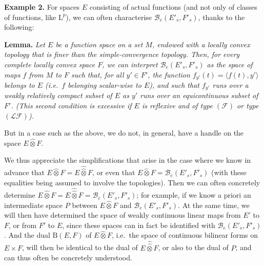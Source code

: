 \documentclass[british]{article}
\newenvironment{itenv}[1]
  {\phantomsection\par\smallskip\noindent\textbf{#1.}\itshape}
  {\par\smallskip}
\newenvironment{rmenv}[1]
  {\phantomsection\par\smallskip\noindent\textbf{#1.}\rmfamily}
  {\par\smallskip}
\newcommand{\oldpage}[1]{\marginpar{\footnotesize$\Big\vert$ \textit{p.~#1}}}
\begin{document}
\protect{}\label{section-2-example-2}
\begin{rmenv}{Example 2}
For spaces \(E\) consisting of actual functions (and not only of classes
of functions, like \(\mathrm{L}^p\)), we can often characterise
\(\mathscr{B}_e(E'_s,F'_s)\), thanks to the following:

\end{rmenv}

\oldpage{99}

\protect{}\label{section-1-lemma}
\begin{itenv}{Lemma}
Let \(E\) be a function space on a set \(M\), endowed with a locally
convex topology that is finer than the simple-convergence topology.
Then, for every complete locally convex space \(F\), we can interpret
\(\mathscr{B}_e(E'_s,F'_s)\) as the space of maps \(f\) from \(M\) to
\(F\) such that, for all \(y'\in F'\), the function
\(f_{y'}(t)=\langle f(t),y'\rangle\) belongs to \(E\) (i.e.~\(f\)
belonging \emph{scalar-wise} to \(E\)), and such that \(f_{y'}\) runs
over a weakly relatively compact subset of \(E\) as \(y'\) runs over an
equicontinuous subset of \(F'\). (This second condition is excessive if
\(E\) is reflexive and of type \((\mathscr{F})\) or type
\((\mathscr{LF})\)).

\end{itenv}

But in a case such as the above, we do not, in general, have a handle on
the space \(E\hat{\otimes}F\).

We thus appreciate the simplifications that arise in the case where we
know in advance that \(E\hat{\otimes}F=E\hat{\hat{\otimes}}F\), or even
that \(E\hat{\otimes}F=\mathscr{B}_e(E'_s,F'_s)\) (with these equalities
being assumed to involve the topologies). Then we can often concretely
determine
\(E\hat{\otimes}F=E\hat{\hat{\otimes}}F=\mathscr{B}_e(E'_s,F'_s)\); for
example, if we know a priori an intermediate space \(P\) between
\(E\hat{\otimes}F\) and \(\mathscr{B}_e(E'_s,F'_s)\). At the same time,
we will then have determined the space of weakly continuous linear maps
from \(E'\) to \(F\), or from \(F'\) to \(E\), since these spaces can in
fact be identified with \(\mathscr{B}_e(E'_s,F'_s)\). And the dual
\(\mathrm{B}(E,F)\) of \(E\hat{\otimes}F\), i.e.~the space of continuous
bilinear forms on \(E\times F\), will then be identical to the dual of
\(E\hat{\hat{\otimes}}F\), or also to the dual of \(P\), and can thus
often be concretely understood.
\end{document}
